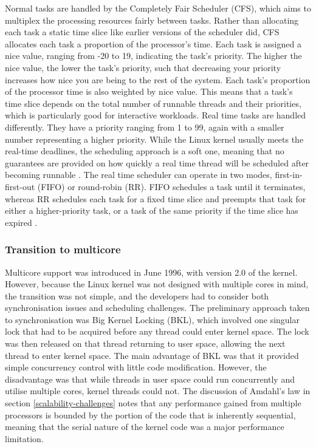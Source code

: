 \documentclass[bsc,frontabs,singlespacing,parskip,deptreport]{infthesis}
\begin{document}
Normal tasks are handled by the Completely Fair Scheduler (CFS), which aims to multiplex the processing resources fairly between tasks. Rather than allocating each task a static time slice like earlier versions of the scheduler did, CFS allocates each task a proportion of the processor's time. Each task is assigned a nice value, ranging from -20 to 19, indicating the task's priority. The higher the nice value, the lower the task's priority, such that decreasing your priority increases how nice you are being to the rest of the system. Each task's proportion of the processor time is also weighted by nice value. This means that a task's time slice depends on the total number of runnable threads and their priorities, which is particularly good for interactive workloads. Real time tasks are handled differently. They have a priority ranging from 1 to 99, again with a smaller number representing a higher priority. While the Linux kernel usually meets the real-time deadlines, the scheduling approach is a soft one, meaning that no guarantees are provided on how quickly a real time thread will be scheduled after becoming runnable \cite{silberschatz}. The real time scheduler can operate in two modes, first-in-first-out (FIFO) or round-robin (RR). FIFO schedules a task until it terminates, whereas RR schedules each task for a fixed time slice and preempts that task for either a higher-priority task, or a task of the same priority if the time slice has expired \cite{seeker}.

\subsubsection{Transition to multicore} \label{transition-to-multicore}
Multicore support was introduced in June 1996, with version 2.0 of the kernel. However, because the Linux kernel was not designed with multiple cores in mind, the transition was not simple, and the developers had to consider both synchronisation issues and scheduling challenges. The preliminary approach taken to synchronisation was Big Kernel Locking (BKL), which involved one singular lock that had to be acquired before any thread could enter kernel space. The lock was then released on that thread returning to user space, allowing the next thread to enter kernel space. The main advantage of BKL was that it provided simple concurrency control with little code modification. However, the disadvantage was that while threads in user space could run concurrently and utilise multiple cores, kernel threads could not. The discussion of Amdahl's law in section \ref{scalability-challenges} notes that any performance gained from multiple processors is bounded by the portion of the code that is inherently sequential, meaning that the serial nature of the kernel code was a major performance limitation.
\end{document}

